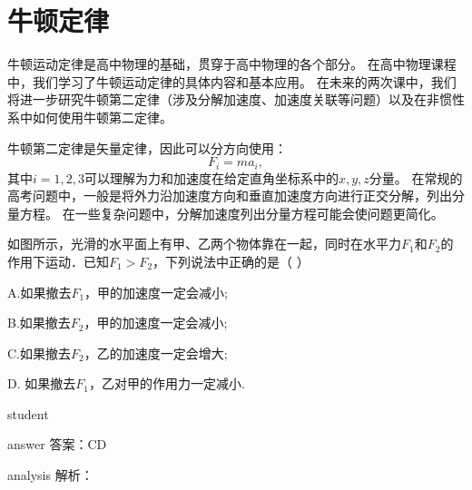 

\chapter{牛顿定律}

 牛顿运动定律是高中物理的基础，贯穿于高中物理的各个部分。
 在高中物理课程中，我们学习了牛顿运动定律的具体内容和基本应用。
 在未来的两次课中，我们将进一步研究牛顿第二定律（涉及分解加速度、加速度关联等问题）以及在非惯性系中如何使用牛顿第二定律。
 
 
 
 牛顿第二定律是矢量定律，因此可以分方向使用：
 \begin{equation}
 F_i = ma_i,
 \end{equation}
 其中$ i=1,2,3 $可以理解为力和加速度在给定直角坐标系中的$ x,y,z $分量。
在常规的高考问题中，一般是将外力沿加速度方向和垂直加速度方向进行正交分解，列出分量方程。
在一些复杂问题中，分解加速度列出分量方程可能会使问题更简化。

\begin{example}
	 如图所示，光滑的水平面上有甲、乙两个物体靠在一起，同时在水平力$ F_1 $和$ F_2 $的作用下运动．已知$ F_1>F_2 $，下列说法中正确的是（    ）
		
		A.如果撤去$ F_1 $，甲的加速度一定会减小;
		
		B.如果撤去$ F_2 $，甲的加速度一定会减小;
		
		C.如果撤去$ F_2 $，乙的加速度一定会增大;
		
		D. 如果撤去$ F_1 $，乙对甲的作用力一定减小.
		
	
	\begin{taggedblock}{student}
		\vspace*{0cm}
	\end{taggedblock}
	
	
	\begin{taggedblock}{answer}
		答案：CD
	\end{taggedblock}
	
	
	\begin{taggedblock}{analysis}
		解析：
	\end{taggedblock}
\end{example}


